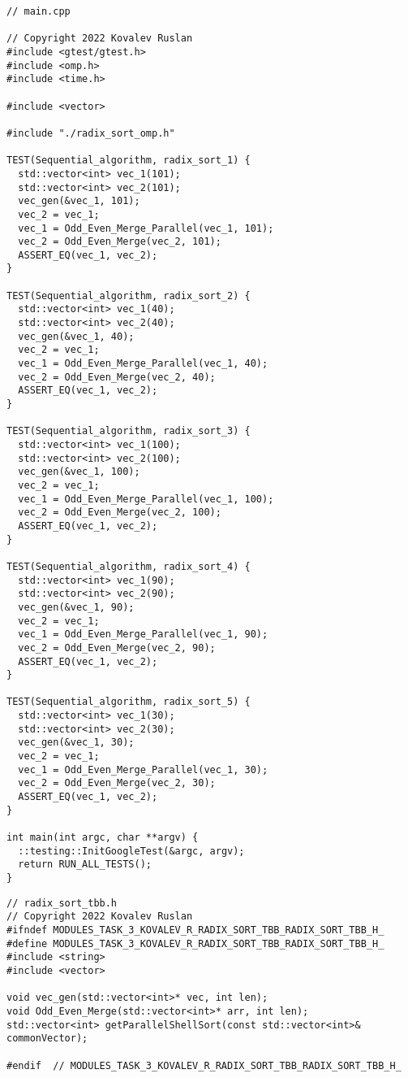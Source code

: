 \documentclass{report}
\begin{document}
\begin{lstlisting}
// main.cpp

// Copyright 2022 Kovalev Ruslan
#include <gtest/gtest.h>
#include <omp.h>
#include <time.h>

#include <vector>

#include "./radix_sort_omp.h"

TEST(Sequential_algorithm, radix_sort_1) {
  std::vector<int> vec_1(101);
  std::vector<int> vec_2(101);
  vec_gen(&vec_1, 101);
  vec_2 = vec_1;
  vec_1 = Odd_Even_Merge_Parallel(vec_1, 101);
  vec_2 = Odd_Even_Merge(vec_2, 101);
  ASSERT_EQ(vec_1, vec_2);
}

TEST(Sequential_algorithm, radix_sort_2) {
  std::vector<int> vec_1(40);
  std::vector<int> vec_2(40);
  vec_gen(&vec_1, 40);
  vec_2 = vec_1;
  vec_1 = Odd_Even_Merge_Parallel(vec_1, 40);
  vec_2 = Odd_Even_Merge(vec_2, 40);
  ASSERT_EQ(vec_1, vec_2);
}

TEST(Sequential_algorithm, radix_sort_3) {
  std::vector<int> vec_1(100);
  std::vector<int> vec_2(100);
  vec_gen(&vec_1, 100);
  vec_2 = vec_1;
  vec_1 = Odd_Even_Merge_Parallel(vec_1, 100);
  vec_2 = Odd_Even_Merge(vec_2, 100);
  ASSERT_EQ(vec_1, vec_2);
}

TEST(Sequential_algorithm, radix_sort_4) {
  std::vector<int> vec_1(90);
  std::vector<int> vec_2(90);
  vec_gen(&vec_1, 90);
  vec_2 = vec_1;
  vec_1 = Odd_Even_Merge_Parallel(vec_1, 90);
  vec_2 = Odd_Even_Merge(vec_2, 90);
  ASSERT_EQ(vec_1, vec_2);
}

TEST(Sequential_algorithm, radix_sort_5) {
  std::vector<int> vec_1(30);
  std::vector<int> vec_2(30);
  vec_gen(&vec_1, 30);
  vec_2 = vec_1;
  vec_1 = Odd_Even_Merge_Parallel(vec_1, 30);
  vec_2 = Odd_Even_Merge(vec_2, 30);
  ASSERT_EQ(vec_1, vec_2);
}

int main(int argc, char **argv) {
  ::testing::InitGoogleTest(&argc, argv);
  return RUN_ALL_TESTS();
}

\end{lstlisting}
\begin{lstlisting}
// radix_sort_tbb.h
// Copyright 2022 Kovalev Ruslan
#ifndef MODULES_TASK_3_KOVALEV_R_RADIX_SORT_TBB_RADIX_SORT_TBB_H_
#define MODULES_TASK_3_KOVALEV_R_RADIX_SORT_TBB_RADIX_SORT_TBB_H_
#include <string>
#include <vector>

void vec_gen(std::vector<int>* vec, int len);
void Odd_Even_Merge(std::vector<int>* arr, int len);
std::vector<int> getParallelShellSort(const std::vector<int>& commonVector);

#endif  // MODULES_TASK_3_KOVALEV_R_RADIX_SORT_TBB_RADIX_SORT_TBB_H_
\end{lstlisting}
\end{document}
